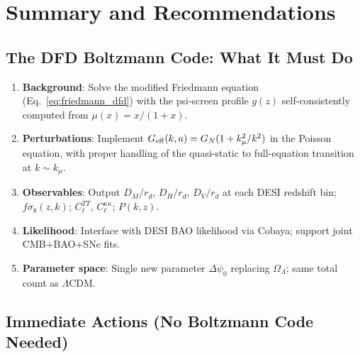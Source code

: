 \documentclass[11pt,a4paper]{article}
\newcommand{\LCDM}{$\Lambda$CDM}
\newcommand{\kmu}{k_\mu}
\newcommand{\Geff}{G_{\rm eff}}
\begin{document}
\section{Summary and Recommendations}
\label{sec:summary}

\subsection{The DFD Boltzmann Code: What It Must Do}

\begin{enumerate}
\item \textbf{Background}: Solve the modified Friedmann equation
  (Eq.~\eqref{eq:friedmann_dfd}) with the psi-screen profile $g(z)$
  self-consistently computed from $\mu(x) = x/(1+x)$.

\item \textbf{Perturbations}: Implement $\Geff(k,a) = G_N(1 + \kmu^2/k^2)$
  in the Poisson equation, with proper handling of the quasi-static
  to full-equation transition at $k \sim \kmu$.

\item \textbf{Observables}: Output $D_M/r_d$, $D_H/r_d$, $D_V/r_d$
  at each DESI redshift bin; $f\sigma_8(z,k)$; $C_\ell^{TT}$,
  $C_\ell^{\kappa\kappa}$; $P(k,z)$.

\item \textbf{Likelihood}: Interface with DESI BAO likelihood via
  Cobaya; support joint CMB+BAO+SNe fits.

\item \textbf{Parameter space}: Single new parameter $\Delta\psi_0$
  replacing $\Omega_\Lambda$; same total count as \LCDM{}.
\end{enumerate}

\subsection{Immediate Actions (No Boltzmann Code Needed)}
\end{document}

